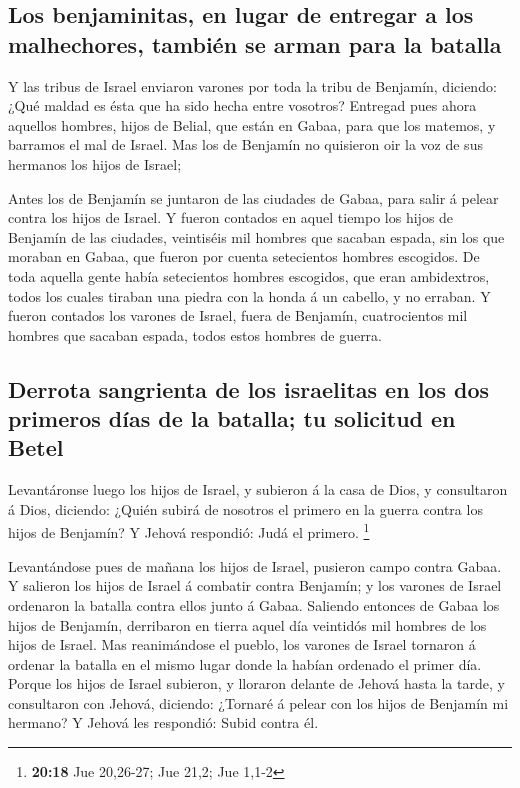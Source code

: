 \hypertarget{los-benjaminitas-en-lugar-de-entregar-a-los-malhechores-tambiuxe9n-se-arman-para-la-batalla}{%
\subsection{Los benjaminitas, en lugar de entregar a los malhechores,
también se arman para la
batalla}\label{los-benjaminitas-en-lugar-de-entregar-a-los-malhechores-tambiuxe9n-se-arman-para-la-batalla}}

 Y las tribus de Israel enviaron varones por toda la tribu
de Benjamín, diciendo: ¿Qué maldad es ésta que ha sido hecha entre
vosotros?  Entregad pues ahora aquellos hombres, hijos de
Belial, que están en Gabaa, para que los matemos, y barramos el mal de
Israel. Mas los de Benjamín no quisieron oir la voz de sus hermanos los
hijos de Israel;

 Antes los de Benjamín se juntaron de las ciudades de
Gabaa, para salir á pelear contra los hijos de Israel.  Y
fueron contados en aquel tiempo los hijos de Benjamín de las ciudades,
veintiséis mil hombres que sacaban espada, sin los que moraban en Gabaa,
que fueron por cuenta setecientos hombres escogidos.  De
toda aquella gente había setecientos hombres escogidos, que eran
ambidextros, todos los cuales tiraban una piedra con la honda á un
cabello, y no erraban.  Y fueron contados los varones de
Israel, fuera de Benjamín, cuatrocientos mil hombres que sacaban espada,
todos estos hombres de guerra.

\hypertarget{derrota-sangrienta-de-los-israelitas-en-los-dos-primeros-duxedas-de-la-batalla-tu-solicitud-en-betel}{%
\subsection{Derrota sangrienta de los israelitas en los dos primeros
días de la batalla; tu solicitud en
Betel}\label{derrota-sangrienta-de-los-israelitas-en-los-dos-primeros-duxedas-de-la-batalla-tu-solicitud-en-betel}}

 Levantáronse luego los hijos de Israel, y subieron á la
casa de Dios, y consultaron á Dios, diciendo: ¿Quién subirá de nosotros
el primero en la guerra contra los hijos de Benjamín? Y Jehová
respondió: Judá el primero. \footnote{\textbf{20:18} Jue 20,26-27; Jue
  21,2; Jue 1,1-2}

 Levantándose pues de mañana los hijos de Israel, pusieron
campo contra Gabaa.  Y salieron los hijos de Israel á
combatir contra Benjamín; y los varones de Israel ordenaron la batalla
contra ellos junto á Gabaa.  Saliendo entonces de Gabaa los
hijos de Benjamín, derribaron en tierra aquel día veintidós mil hombres
de los hijos de Israel.  Mas reanimándose el pueblo, los
varones de Israel tornaron á ordenar la batalla en el mismo lugar donde
la habían ordenado el primer día.  Porque los hijos de
Israel subieron, y lloraron delante de Jehová hasta la tarde, y
consultaron con Jehová, diciendo: ¿Tornaré á pelear con los hijos de
Benjamín mi hermano? Y Jehová les respondió: Subid contra él.

